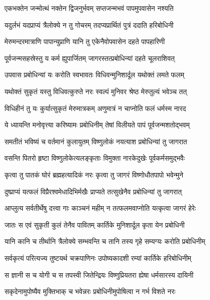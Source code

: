 
\twolineshloka
{एकभक्तेन जन्मोत्थं नक्तेन द्विजनुर्भवम्}
{सप्तजन्मभवं पापमुपवासेन नश्यति} %

\twolineshloka
{यदुर्लभं यदप्राप्यं त्रैलोक्ये न तु गोचरम्}
{तदप्यप्रार्थितं पुत्रं ददाति हरिबोधिनी} %

\twolineshloka
{मेरुमन्दरमात्राणि पापान्युप्राणि यानि तु}
{एकेनैवोपवासेन दहते पापहारिणी} %

\twolineshloka
{पूर्वजन्मसहस्रेस्तु य कर्म ह्युपार्जितम्}
{जागरस्तत्प्रबोधिन्यां दहते चूलराशिवत्} %

\twolineshloka
{उपवास प्रबोधिन्यां यः करोति स्वभावतः}
{विधिवन्मुनिशार्दूल यथोक्तं लमते फलम्} %

\twolineshloka
{यथोक्तं सुकृतं यस्तु विधिवत्कुरुते नरः}
{स्वल्पं मुनिवर श्रेष्ठ मेरुतुल्यं भवेञ्च तत्} %

\twolineshloka
{विधिहीनं तु यः कुर्यात्सुकृतं मेरुमात्रकम्}
{अणुमात्रं न चाप्नोति फलं धर्मस्म नारद} %

\twolineshloka
{ये ध्यायन्ति मनोवृत्त्या करिष्यामः प्रबोधिनीम्}
{तेषां विलीयते पापं पूर्वजन्मशतोद्भवम्} %

\twolineshloka
{समतीतं भविष्यं च वर्तमानं कुलायुतम्}
{विष्णुलोकं नयत्याश प्रबोधिन्यां तु जागरात} %

\twolineshloka
{वसन्ति पितरो हृष्टा विष्णुलोकेत्यलङ्कृताः}
{विमुक्ता नारकेदुखेः पूर्वकर्मसमुद्भवैः} %

\twolineshloka
{कृत्वा तु पातकं घोरं ब्रह्महत्यादिकं नरः}
{कृत्वा तु जागरं विष्णोधौतपापो भवेन्मुने} %

\twolineshloka
{दुष्प्राप्यं यत्फलं विप्रैरश्वमेधादिभिर्मखैः}
{प्राप्यते तत्सुखेनैव प्रबोधिन्यां तु जागरात्} %

\twolineshloka
{आप्लुत्य सर्वतीर्थेषु दत्त्वा गाः काञ्चनं महीम्}
{न तत्फलमवाप्नोति यत्कृत्वा जागरं हेरेः} %

\twolineshloka
{जातः स एवं सुकृती कुलं तेनैव पावितम्}
{कार्तिके मुनिशार्दूल कृता येन प्रबोधिनी} %

\twolineshloka
{यानि कानि च तीर्थानि त्रैलोक्ये सम्भवन्ति च}
{तानि तस्य गृहे सम्यग्यः करोति प्रबोधिनीम्} %

\twolineshloka
{सर्वकृत्यं परित्यज्य तुष्टयर्थ चक्रपाणिनः}
{उपोष्यकादशी रम्यां कार्तिके हरिबोधिनीम्} %

\twolineshloka
{स ज्ञानी स च योगी च स तपस्वी जितेन्द्रियः}
{विष्णुप्रियतरा ह्येषा धर्मसारस्य दायिनी} %

\twolineshloka
{सकृदेनामुपोष्यैव मुक्तिभाक् च भवेन्नरः}
{प्रबोधिनीमुपोषित्वा न गर्भ विशते नरः} %

